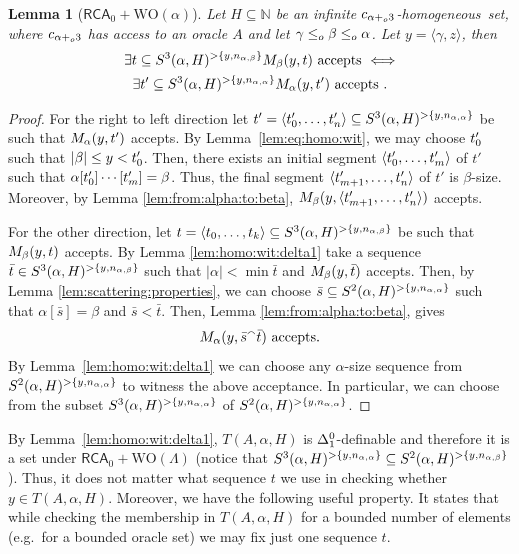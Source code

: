 \documentclass[11pt]{amsart}
\newtheorem{lemma}[thm]{Lemma}
\theoremstyle{definition}
\theoremstyle{remark}
\theoremstyle{plain}
\def\la{\langle}
\def\ra{\rangle}
\newcommand{\numberset}{\mathbb}
\newcommand{\N}{\numberset{N}}
\def\a{\alpha}
\def\b{\beta}
\def\conc{{}^\smallfrown}
\newcommand{\RCA}{\mathsf{RCA}_0}
\newcommand{\set}[1]{{\{{#1}\}}}
\def\WO{{\textrm{WO}}}
\newcommand{\leqo}{\leq\sb{o}}
\newcommand{\pluso}{+\sb{o}}
\def\N{{\mathbb{N}}}
\newcommand{\homo}{homogeneous}
\def\ifff{\Longleftrightarrow}
\begin{document}
\begin{lemma}[$\RCA+\WO(\a)$]\label{lem:T:beta:gamma}
Let $H \subseteq \N$ be an infinite $c\sb{\alpha\pluso3}$-\homo\ set, where $c\sb{\alpha\pluso3}$ has access to an oracle $A$ and let $\gamma \leqo \beta \leqo \alpha$.
Let $y=\la \gamma,z \ra$, then
\begin{multline*}
\exists t \subseteq S\sp3(\alpha,H)\sp{>\set{y,n_{\a,\b}}}M\sb\beta(y,t)\mbox{ accepts }
\ifff \\
\exists t' \subseteq S\sp3(\alpha,H)\sp{>\set{y,n_{\a,\a}}}M\sb\alpha(y,t')\mbox{ accepts }.
\end{multline*}
\end{lemma}

\begin{proof}
For the right to left direction let $t'= \langle t'\sb0,\dots,t'\sb n\rangle\subseteq  S\sp3(\alpha,H)\sp{>\set{y,n_{\a,\a}}}$ be such that  $M\sb\alpha(y,t')$ accepts. 
By Lemma~\ref{lem:eq:homo:wit}, we may choose $t'\sb0$ such that $|\beta| \leq y < t'\sb0$. 
Then, there exists an initial segment $\langle t'\sb0,\dots, t'\sb m\rangle$ of $t'$ such that $\alpha[t'\sb0]\cdots [t'\sb m]=\beta$.
Thus, the final segment $\langle t'\sb{m+1},\dots, t'\sb n\rangle$ of $t'$ is $\beta$-size. 
Moreover, by Lemma \ref{lem:from:alpha:to:beta}, $M\sb\beta(y,\langle t'\sb{m+1},\dots,t'\sb n\rangle)$ accepts.

For the other direction, let $t=\langle t\sb0,\dots,t\sb k\rangle\subseteq S\sp3 (\alpha, H)\sp{>\set{y,n_{\a,\b}}}$ be such that $M\sb\beta(y,t)$ accepts. 
By Lemma \ref{lem:homo:wit:delta1} take a sequence $\bar{t}\in S\sp 3(\alpha, H)\sp{> \set{y, n_{\a,\b}}}$ such that $|\alpha| < \min \bar{t}$ and $M\sb\beta(y,\bar{t})$ accepts.
Then, by Lemma \ref{lem:scattering:properties}, we can choose $\bar{s}\subseteq S\sp 2(\alpha, H)\sp{> \set{y, n_{\a,\a}}}$ such that $\alpha[\bar{s}]=\beta$ and $\bar{s} < \bar{t}$.
Then, Lemma \ref{lem:from:alpha:to:beta}, gives 
$$
M\sb\alpha(y,\bar{s} \conc \bar{t})\mbox{ accepts.}
$$
By Lemma~\ref{lem:homo:wit:delta1} we can choose any $\alpha$-size sequence from $S\sp2(\alpha,H)\sp{>\set{y,n_{\a,\a}}}$ to witness the above acceptance. 
In particular, we can choose from the subset $S\sp3(\alpha,H)\sp{>\set{y,n_{\a,\a}}}$ of $S\sp2(\alpha,H)\sp{>\set{y,n_{\a,\a}}}$.
\end{proof}

By Lemma~\ref{lem:homo:wit:delta1}, $T(A,\alpha,H)$ is $\Delta^0\sb1$-definable and therefore it is a set under $\RCA+\WO(\Lambda)$ (notice that $S\sp3(\alpha, H)\sp{>\set{y, n_{\a,\a}}}\subseteq S\sp2(\alpha, H)\sp{>\set{y, n_{\a,\b}}}$).
Thus, it does not matter what sequence $t$ we use in checking whether $y\in T(A,\alpha,H)$. 
Moreover, we have the following useful property. 
It states that while checking the membership in $T(A,\alpha,H)$ for a bounded number of elements (e.g.\ for a bounded oracle set) we may fix just one sequence $t$.
\end{document}
